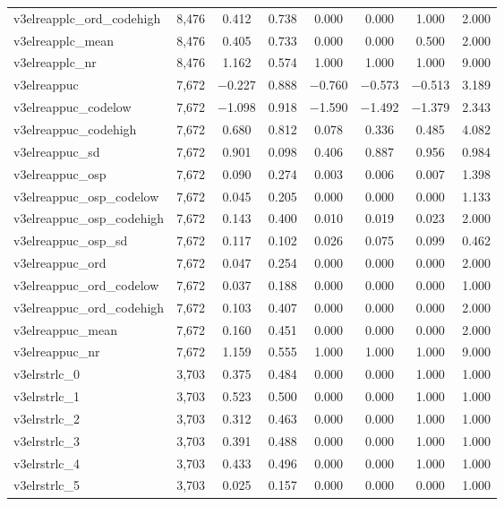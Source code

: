 \begin{table}[!htbp]
\begin{tabular}{@{\extracolsep{5pt}}lccccccc}
v3elreapplc\_ord\_codehigh & 8,476 & 0.412 & 0.738 & 0.000 & 0.000 & 1.000 & 2.000 \\ 
v3elreapplc\_mean & 8,476 & 0.405 & 0.733 & 0.000 & 0.000 & 0.500 & 2.000 \\ 
v3elreapplc\_nr & 8,476 & 1.162 & 0.574 & 1.000 & 1.000 & 1.000 & 9.000 \\ 
v3elreappuc & 7,672 & $-$0.227 & 0.888 & $-$0.760 & $-$0.573 & $-$0.513 & 3.189 \\ 
v3elreappuc\_codelow & 7,672 & $-$1.098 & 0.918 & $-$1.590 & $-$1.492 & $-$1.379 & 2.343 \\ 
v3elreappuc\_codehigh & 7,672 & 0.680 & 0.812 & 0.078 & 0.336 & 0.485 & 4.082 \\ 
v3elreappuc\_sd & 7,672 & 0.901 & 0.098 & 0.406 & 0.887 & 0.956 & 0.984 \\ 
v3elreappuc\_osp & 7,672 & 0.090 & 0.274 & 0.003 & 0.006 & 0.007 & 1.398 \\ 
v3elreappuc\_osp\_codelow & 7,672 & 0.045 & 0.205 & 0.000 & 0.000 & 0.000 & 1.133 \\ 
v3elreappuc\_osp\_codehigh & 7,672 & 0.143 & 0.400 & 0.010 & 0.019 & 0.023 & 2.000 \\ 
v3elreappuc\_osp\_sd & 7,672 & 0.117 & 0.102 & 0.026 & 0.075 & 0.099 & 0.462 \\ 
v3elreappuc\_ord & 7,672 & 0.047 & 0.254 & 0.000 & 0.000 & 0.000 & 2.000 \\ 
v3elreappuc\_ord\_codelow & 7,672 & 0.037 & 0.188 & 0.000 & 0.000 & 0.000 & 1.000 \\ 
v3elreappuc\_ord\_codehigh & 7,672 & 0.103 & 0.407 & 0.000 & 0.000 & 0.000 & 2.000 \\ 
v3elreappuc\_mean & 7,672 & 0.160 & 0.451 & 0.000 & 0.000 & 0.000 & 2.000 \\ 
v3elreappuc\_nr & 7,672 & 1.159 & 0.555 & 1.000 & 1.000 & 1.000 & 9.000 \\ 
v3elrstrlc\_0 & 3,703 & 0.375 & 0.484 & 0.000 & 0.000 & 1.000 & 1.000 \\ 
v3elrstrlc\_1 & 3,703 & 0.523 & 0.500 & 0.000 & 0.000 & 1.000 & 1.000 \\ 
v3elrstrlc\_2 & 3,703 & 0.312 & 0.463 & 0.000 & 0.000 & 1.000 & 1.000 \\ 
v3elrstrlc\_3 & 3,703 & 0.391 & 0.488 & 0.000 & 0.000 & 1.000 & 1.000 \\ 
v3elrstrlc\_4 & 3,703 & 0.433 & 0.496 & 0.000 & 0.000 & 1.000 & 1.000 \\ 
v3elrstrlc\_5 & 3,703 & 0.025 & 0.157 & 0.000 & 0.000 & 0.000 & 1.000 \\ 

\end{tabular}
\end{table}
